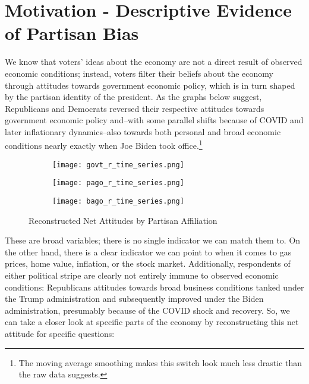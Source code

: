 \documentclass{article}
\begin{document}
\section{Motivation - Descriptive Evidence of Partisan Bias}

We know that voters' ideas about the economy are not a direct result of observed economic conditions; instead, voters filter their beliefs about the economy through attitudes towards government economic policy, which is in turn shaped by the partisan identity of the president. As the graphs below suggest, Republicans and Democrats reversed their respective attitudes towards government economic policy and--with some parallel shifts because of COVID and later inflationary dynamics--also towards both personal and broad economic conditions nearly exactly when Joe Biden took office.\footnote{The moving average smoothing makes this switch look much less drastic than the raw data suggests.}

\begin{figure}[ht!]
  \centering
  \begin{subfigure}[b]{0.49\textwidth}
    \centering
    \texttt{[image: govt\_r\_time\_series.png]}
    \label{fig:govt_time_series}
  \end{subfigure}
  \begin{subfigure}[b]{0.49\textwidth}
    \centering
    \texttt{[image: pago\_r\_time\_series.png]}
    \label{fig:pago_time_series}
  \end{subfigure}
   \begin{subfigure}[b]{0.5\textwidth}
    \centering
    \texttt{[image: bago\_r\_time\_series.png]}
    \label{fig:bago_time_series}
  \end{subfigure}
  \caption{Reconstructed Net Attitudes by Partisan Affiliation}
  \label{fig:panel}
\end{figure}

These are broad variables; there is no single indicator we can match them to. On the other hand, there is a clear indicator we can point to when it comes to gas prices, home value, inflation, or the stock market. Additionally, respondents of either political stripe are clearly not entirely immune to observed economic conditions: Republicans attitudes towards broad business conditions tanked under the Trump administration and subsequently improved under the Biden administration, presumably because of the COVID shock and recovery. So, we can take a closer look at specific parts of the economy by reconstructing this net attitude for specific questions: 
\end{document}
